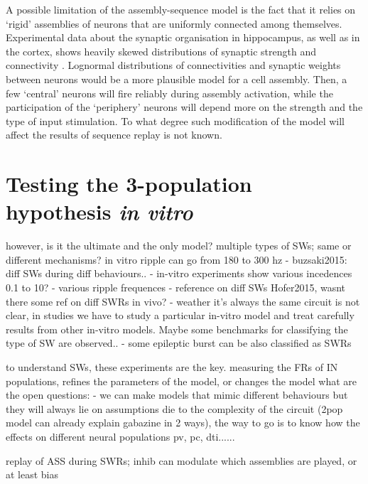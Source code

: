   A possible limitation of the assembly-sequence model is the fact that it
  relies on `rigid' assemblies of neurons that are uniformly connected among
  themselves. Experimental data about the synaptic organisation in hippocampus,
  as well as in the cortex, shows heavily skewed distributions of synaptic
  strength and connectivity \citep[e.g.,][]{Takahashi2010, Buzsaki2014,
  Cossell2015}. Lognormal distributions of connectivities and synaptic weights
  between neurons would be a more plausible model for a cell assembly. Then, a
  few `central' neurons will fire reliably during assembly activation, while
  the participation of the `periphery' neurons will depend more on the strength
  and the type of input stimulation. To what degree such modification of the
  model will affect the results of sequence replay is not known.

\section{Testing the 3-population hypothesis \textit{in vitro}}

  however, is it the ultimate and the only model?
  multiple types of SWs; same or different mechanisms? in vitro ripple can go from 180 to 300 hz
  - buzsaki2015: diff SWs during diff behaviours..
  - in-vitro experiments show various incedences 0.1 to 10?
  - various ripple frequences
  - reference on diff SWs Hofer2015, wasnt there some ref on diff SWRs in vivo?
  - weather it's always the same circuit is not clear, in studies we have to study a particular 
  in-vitro model and treat carefully results from other in-vitro models. Maybe some benchmarks for 
  classifying the type of SW are observed..
  - some epileptic burst can be also classified as SWRs

  to understand SWs, these experiments are the key.  measuring the FRs of IN
  populations, refines the parameters of the model, or changes the model
  what are the open questions:
  - we can make models that mimic different behaviours but they will always
  lie on assumptions die to the complexity of the circuit (2pop model can
  already explain gabazine in 2 ways), the way to go is to know how the
  effects on different neural populations pv, pc, dti......

  replay of ASS during SWRs; inhib can modulate which assemblies are played, or at least bias

